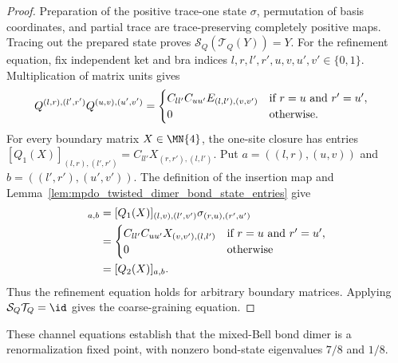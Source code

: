 \begin{proof}\leanok
    Preparation of the positive trace-one state $\sigma$, permutation
    of basis coordinates, and partial trace are trace-preserving completely
    positive maps.
    Tracing out the prepared state proves
    $\mathcal S_Q(\mathcal T_Q(Y))=Y$.
    For the refinement equation, fix independent ket and bra indices
    $l,r,l',r',u,v,u',v'\in\{0,1\}$. Multiplication of matrix units gives
    \begin{align}
        Q^{(l,r),(l',r')}Q^{(u,v),(u',v')}
         & =\begin{cases}
                C_{ll'}C_{uu'}E_{(l,l'),(v,v')}
                  & \text{if } r=u \text{ and } r'=u', \\
                0 & \text{otherwise}.
            \end{cases}
        \notag
    \end{align}
    For every boundary matrix $X\in\MN{4}$, the one-site
    closure has entries $[Q_1(X)]_{(l,r),(l',r')}=C_{ll'}X_{(r,r'),(l,l')}$.
    Put $a=((l,r),(u,v))$ and $b=((l',r'),(u',v'))$.
    The definition of the insertion map and
    Lemma~\ref{lem:mpdo_twisted_dimer_bond_state_entries} give
    \begin{align}
        [\mathcal T_Q(Q_1(X))]_{a,b}
         & =[Q_1(X)]_{(l,v),(l',v')}\sigma_{(r,u),(r',u')}
        \notag                                             \\
         & =\begin{cases}
                C_{ll'}C_{uu'}X_{(v,v'),(l,l')}
                  & \text{if } r=u \text{ and } r'=u', \\
                0 & \text{otherwise}
            \end{cases}
        \notag                                             \\
         & =[Q_2(X)]_{a,b}.
        \notag
    \end{align}
    Thus the refinement equation holds for arbitrary boundary matrices.
    Applying $\mathcal S_Q\mathcal T_Q=\id$ gives the coarse-graining equation.
\end{proof}

These channel equations establish that the mixed-Bell bond dimer is a
renormalization fixed point, with nonzero bond-state eigenvalues $7/8$
and $1/8$.


